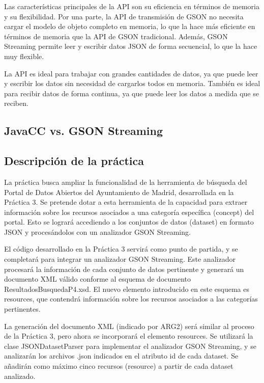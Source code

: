 Las características principales de la API son su eficiencia en términos de memoria y  su flexibilidad. Por una parte, la API de transmisión de GSON no necesita cargar el modelo de objeto completo en memoria, lo que la hace más eficiente en términos de memoria que la API de GSON tradicional. Además, GSON Streaming permite leer y escribir datos JSON de forma secuencial, lo que la hace muy flexible.

La API es ideal para trabajar con grandes cantidades de datos, ya que puede leer y escribir los datos sin necesidad de cargarlos todos en memoria. También es ideal para recibir datos de forma continua, ya que puede leer los datos a medida que se reciben.


\subsection{JavaCC vs. GSON Streaming}

\subsection{Descripción de la práctica}

\noindent La práctica busca ampliar la funcionalidad de la herramienta de búsqueda del Portal de Datos Abiertos del Ayuntamiento de Madrid, desarrollada en la Práctica 3. Se pretende dotar a esta herramienta de la capacidad para extraer información sobre los recursos asociados a una categoría específica (concept) del portal. Esto se logrará accediendo a los conjuntos de datos (dataset) en formato JSON y procesándolos con un analizador GSON Streaming.

El código desarrollado en la Práctica 3 servirá como punto de partida, y se completará para integrar un analizador GSON Streaming. Este analizador procesará la información de cada conjunto de datos pertinente y generará un documento XML válido conforme al esquema de documento ResultadosBusquedaP4.xsd. El nuevo elemento introducido en este esquema es resources, que contendrá información sobre los recursos asociados a las categorías pertinentes.

La generación del documento XML (indicado por ARG2) será similar al proceso de la Práctica 3, pero ahora se incorporará el elemento resources. Se utilizará la clase JSONDatasetParser para implementar el analizador GSON Streaming, y se analizarán los archivos .json indicados en el atributo id de cada dataset. Se añadirán como máximo cinco recursos (resource) a partir de cada dataset analizado.

